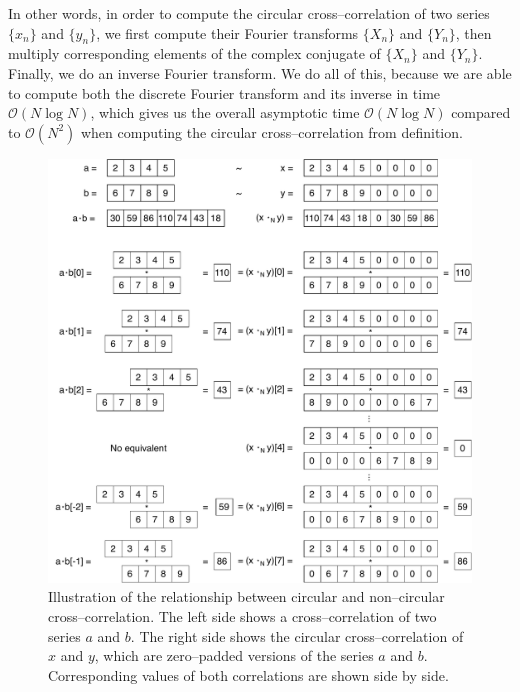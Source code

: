 In other words, in order to compute the circular cross--correlation of two series $\{x_n\}$ and $\{y_n\}$, we first compute their Fourier transforms $\{X_n\}$ and $\{Y_n\}$, then multiply corresponding elements of the complex conjugate of $\{X_n\}$ and $\{Y_n\}$. Finally, we do an inverse Fourier transform. We do all of this, because we are able to compute both the discrete Fourier transform and its inverse in time $\mathcal{O}(N \log N)$, which gives us the overall asymptotic time $\mathcal{O}(N \log N)$ compared to $\mathcal{O}(N^2)$ when computing the circular cross--correlation from definition.


\begin{figure}
	\centering
	\includegraphics[width=\textwidth]{img/circ-cross-example}
	\caption{Illustration of the relationship between circular and non--circular cross--correlation. The left side shows a cross--correlation of two series $a$ and $b$. The right side shows the circular cross--correlation of $x$ and $y$, which are zero--padded versions of the series $a$ and $b$. Corresponding values of both correlations are shown side by side.}
	\label{circ-cross-example}
\end{figure}

